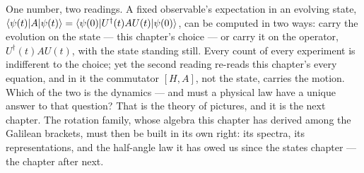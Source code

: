One number, two readings. A fixed observable's expectation in an evolving state, $\braket{\psi(t)|A|\psi(t)} = \braket{\psi(0)|U^\dagger(t)AU(t)|\psi(0)}$, can be computed in two ways: carry the evolution on the state --- this chapter's choice --- or carry it on the operator, $U^\dagger(t)AU(t)$, with the state standing still. Every count of every experiment is indifferent to the choice; yet the second reading re-reads this chapter's every equation, and in it the commutator $[H,A]$, not the state, carries the motion. Which of the two is the dynamics --- and must a physical law have a unique answer to that question? That is the theory of pictures, and it is the next chapter. The rotation family, whose algebra this chapter has derived among the Galilean brackets, must then be built in its own right: its spectra, its representations, and the half-angle law it has owed us since the states chapter --- the chapter after next.

